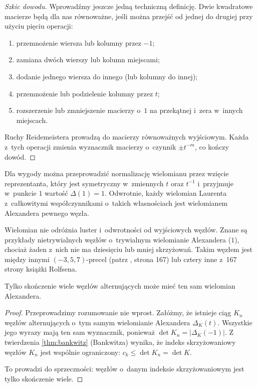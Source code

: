 \begin{proof}[Szkic dowodu]
	Wprowadźmy jeszcze jedną techniczną definicję.
	Dwie kwadratowe macierze będą dla nas równoważne, jeśli można przejść od jednej do drugiej przy użyciu pięciu operacji:
	\begin{enumerate}[leftmargin=*]
	\itemsep0em
		\item przemnożenie wiersza lub kolumny przez $-1$;
		\item zamiana dwóch wierszy lub kolumn miejscami;
		\item dodanie jednego wiersza do innego (lub kolumny do innej);
		\item przemnożenie lub podzielenie kolumny przez $t$;
		\item rozszerzenie lub zmniejszenie macierzy o~$1$ na przekątnej i~zera w~innych miejscach.
	\end{enumerate}

	Ruchy Reidemeistera prowadzą do macierzy równoważnych wyjściowym.
	Każda z~tych operacji zmienia wyznacznik macierzy o~czynnik $\pm t^{-m}$, co kończy dowód.
\end{proof}

Dla wygody można przeprowadzić normalizację wielomianu przez wzięcie reprezentanta, który jest symetryczny w~zmiennych $t$ oraz $t^{-1}$ i~przyjmuje w~punkcie $1$ wartość $\Delta(1) = 1$.
Odwrotnie, każdy wielomian Laurenta z~całkowitymi współczynnikami o~takich własnościach jest wielomianem Alexandera pewnego węzła.

Wielomian nie odróżnia luster i~odwrotności od wyjściowych węzłów.
Znane są przykłady nietrywialnych węzłów o~trywialnym wielomianie Alexandera ($1$), chociaż żaden z~nich nie ma dziesięciu lub mniej skrzyżowań.
Takim węzłem jest między innymi  $(-3, 5, 7)$-precel (patrz \cite{adams94}, strona 167) lub cztery inne z~167 strony książki \cite{rolfsen76} Rolfsena.

\begin{proposition}
	Tylko skończenie wiele węzłów alternujących może mieć ten sam wielomian Alexandera.
\end{proposition}

\begin{proof}
	Przeprowadzimy rozumowanie nie wprost.
	Załóżmy, że istnieje ciąg $K_n$ węzłów alternujących o~tym samym wielomianie Alexandera $\Delta_K(t)$.
	Wszystkie jego wyrazy mają ten sam wyznacznik, ponieważ $\det K_n = |\Delta_K(-1)|$.
	Z twierdzenia \ref{thm:bankwitz} (Bankwitza) wynika, że indeks skrzyżowaniowy węzłów $K_n$ jest wspólnie ograniczony: $c_k \le \det K_n = \det K$.

	To prowadzi do sprzeczności: węzłów o~danym indeksie skrzyżowaniowym jest tylko skończenie wiele.
\end{proof}

